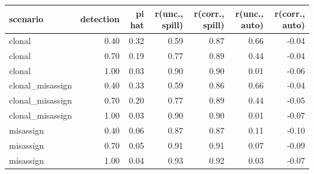 \begin{tabular}{lrrrrrr}
\toprule
scenario & detection & pi hat & r(unc., spill) & r(corr., spill) & r(unc., auto) & r(corr., auto) \\
\midrule
clonal & 0.40 & 0.32 & 0.59 & 0.87 & 0.66 & -0.04 \\
clonal & 0.70 & 0.19 & 0.77 & 0.89 & 0.44 & -0.04 \\
clonal & 1.00 & 0.03 & 0.90 & 0.90 & 0.01 & -0.06 \\
clonal\_misassign & 0.40 & 0.33 & 0.59 & 0.86 & 0.66 & -0.04 \\
clonal\_misassign & 0.70 & 0.20 & 0.77 & 0.89 & 0.44 & -0.05 \\
clonal\_misassign & 1.00 & 0.03 & 0.90 & 0.90 & 0.01 & -0.07 \\
misassign & 0.40 & 0.06 & 0.87 & 0.87 & 0.11 & -0.10 \\
misassign & 0.70 & 0.05 & 0.91 & 0.91 & 0.07 & -0.09 \\
misassign & 1.00 & 0.04 & 0.93 & 0.92 & 0.03 & -0.07 \\
\bottomrule
\end{tabular}
